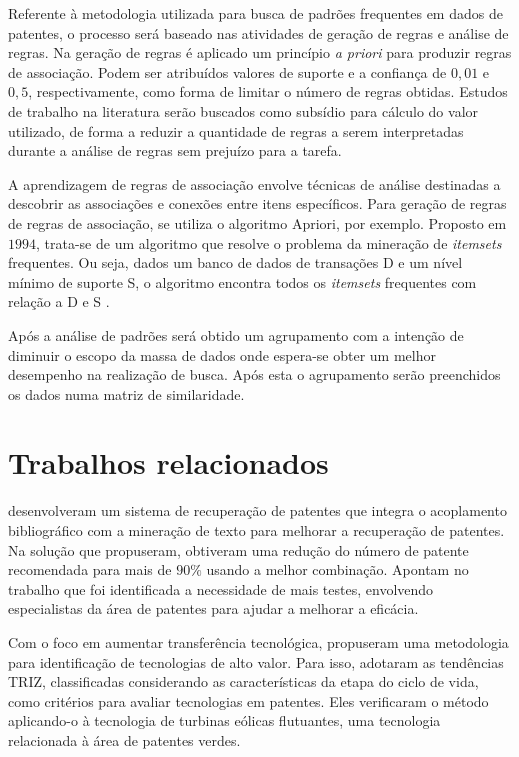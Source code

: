 \documentclass[12pt]{article}
\begin{document}
Referente à metodologia utilizada para busca de padrões frequentes em dados de patentes, o processo será baseado nas atividades de geração de regras e análise de regras.  Na geração de regras é aplicado um princípio \textit{a priori} para produzir regras de associação. Podem ser atribuídos valores de suporte e a confiança de $0,01$ e $0,5$, respectivamente, como forma de limitar o número de regras obtidas. Estudos de trabalho na literatura serão buscados como subsídio para cálculo do valor utilizado, de forma a reduzir a quantidade de regras a serem interpretadas durante a análise de regras sem prejuízo para a tarefa. 

A aprendizagem de regras de associação envolve técnicas de análise destinadas a descobrir as associações e conexões entre itens específicos. Para geração de regras de regras de associação, se utiliza o algoritmo Apriori, por exemplo. Proposto em $1994$, trata-se de um algoritmo que resolve o problema da mineração de \textit{itemsets} frequentes. Ou seja, dados um banco de dados de transações D e um nível mínimo de suporte S, o algoritmo encontra todos os \textit{itemsets} frequentes com relação a D e S \citep{agrawal1994fast}.

Após a análise de padrões será obtido um agrupamento com a intenção de diminuir o escopo da massa de dados onde espera-se obter um melhor desempenho na realização de busca. Após esta o agrupamento serão preenchidos os dados numa matriz de similaridade.

\section{Trabalhos relacionados}
\label{sec:trab}

\cite{liu2011development} desenvolveram um sistema de recuperação de patentes que integra o acoplamento bibliográfico com a mineração de texto para melhorar a recuperação de patentes. Na solução que propuseram, obtiveram uma redução do número de patente recomendada para mais de $90\%$ usando a melhor combinação. Apontam no trabalho que foi identificada a necessidade de mais testes, envolvendo especialistas da área de patentes para ajudar a melhorar a eficácia.

Com o foco em aumentar transferência tecnológica, \cite{park2013identification} propuseram uma metodologia para identificação de tecnologias de alto valor. 
Para isso, adotaram as tendências TRIZ, classificadas considerando as características da etapa do ciclo de vida, como critérios para avaliar tecnologias em patentes. Eles verificaram o método aplicando-o à tecnologia de turbinas eólicas flutuantes, uma tecnologia relacionada à área de patentes verdes.
\end{document}
